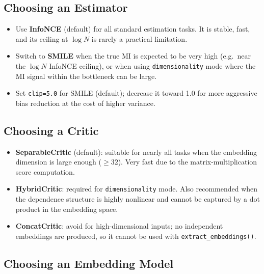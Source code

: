 \documentclass[12pt]{article}
\newcommand{\api}[1]{\texttt{#1}}
\begin{document}
\subsection{Choosing an Estimator}

\begin{itemize}[leftmargin=*]
  \item Use \textbf{InfoNCE} (default) for all standard estimation tasks.
        It is stable, fast, and its ceiling at $\log N$ is rarely a
        practical limitation.
  \item Switch to \textbf{SMILE} when the true MI is expected to be very
        high (e.g.\ near the $\log N$ InfoNCE ceiling), or when using
        \api{dimensionality} mode where the MI signal within the bottleneck
        can be large.
  \item Set \api{clip=5.0} for SMILE (default); decrease it toward 1.0 for
        more aggressive bias reduction at the cost of higher variance.
\end{itemize}

\subsection{Choosing a Critic}

\begin{itemize}[leftmargin=*]
  \item \textbf{SeparableCritic} (default): suitable for nearly all tasks
        when the embedding dimension is large enough ($\ge 32$).  Very fast
        due to the matrix-multiplication score computation.
  \item \textbf{HybridCritic}: required for \api{dimensionality} mode.
        Also recommended when the dependence structure is highly nonlinear
        and cannot be captured by a dot product in the embedding space.
  \item \textbf{ConcatCritic}: avoid for high-dimensional inputs; no
        independent embeddings are produced, so it cannot be used with
        \api{extract\_embeddings()}.
\end{itemize}

\subsection{Choosing an Embedding Model}
\end{document}
